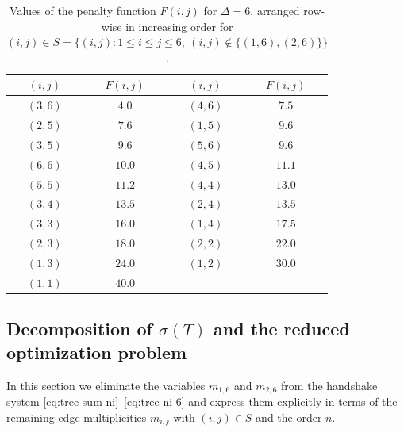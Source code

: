 \documentclass[preprint,12pt]{elsarticle}
\begin{document}
\begin{table}[ht]
\centering
\caption{Values of the penalty function $F(i,j)$ for $\Delta=6$, arranged row-wise
in increasing order for $(i,j)\in S=\{(i,j):1\le i\le j\le 6,\ (i,j)\notin\{(1,6),(2,6)\}\}$.}
\label{tab:F-delta6-row}
\begin{tabular}{cccc}
\hline
$(i,j)$ & $F(i,j)$ & $(i,j)$ & $F(i,j)$ \\ \hline
$(3,6)$ & $4.0$   & $(4,6)$ & $7.5$   \\
$(2,5)$ & $7.6$   & $(1,5)$ & $9.6$   \\
$(3,5)$ & $9.6$   & $(5,6)$ & $9.6$   \\
$(6,6)$ & $10.0$  & $(4,5)$ & $11.1$  \\
$(5,5)$ & $11.2$  & $(4,4)$ & $13.0$  \\
$(3,4)$ & $13.5$  & $(2,4)$ & $13.5$  \\
$(3,3)$ & $16.0$  & $(1,4)$ & $17.5$  \\
$(2,3)$ & $18.0$  & $(2,2)$ & $22.0$  \\
$(1,3)$ & $24.0$  & $(1,2)$ & $30.0$  \\
$(1,1)$ & $40.0$  &         &         \\ \hline
\end{tabular}
\end{table}

\subsection{Decomposition of $\sigma(T)$ and the reduced optimization problem}
\label{sec:decomposition}

In this section we eliminate the variables $m_{1,6}$ and $m_{2,6}$ from the handshake
system \eqref{eq:tree-sum-ni}--\eqref{eq:tree-ni-6} and express them explicitly in terms
of the remaining edge-multiplicities $m_{i,j}$ with $(i,j)\in S$ and the order $n$.
\end{document}
